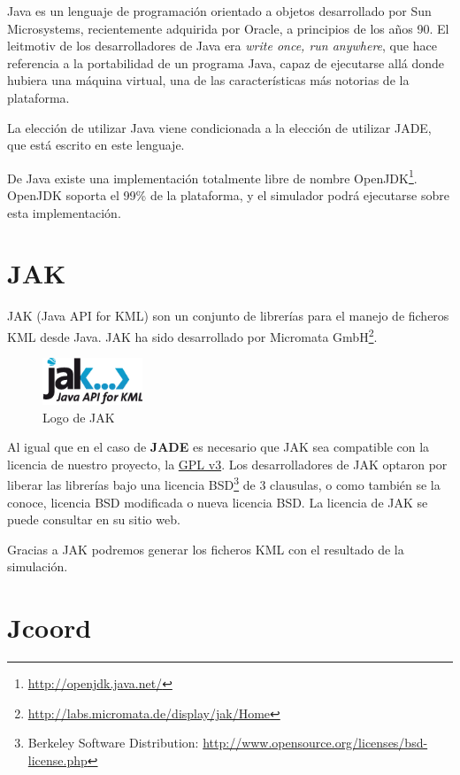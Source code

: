 Java es un lenguaje de programación orientado a objetos desarrollado por Sun
Microsystems, recientemente adquirida por Oracle, a principios de los años 90.
El leitmotiv de los desarrolladores de Java era {\em write once, run anywhere},
que hace referencia a la portabilidad de un programa Java, capaz de ejecutarse
allá donde hubiera una máquina virtual, una de las características más notorias
de la plataforma.

La elección de utilizar Java viene condicionada a la elección de utilizar JADE,
que está escrito en este lenguaje.

De Java existe una implementación totalmente libre de nombre
OpenJDK\footnote{\url{http://openjdk.java.net/}}. OpenJDK soporta el 99\% de la
plataforma, y el simulador podrá ejecutarse sobre esta implementación.

\section*{JAK}

JAK (Java API for KML) son un conjunto de librerías para el manejo de ficheros
KML desde Java. JAK ha sido desarrollado por Micromata
GmbH\footnote{\url{http://labs.micromata.de/display/jak/Home}}.

\begin{figure}[H]
 \centering
 \includegraphics[width=30mm]{figuras/cap4/jak.png}
 \caption{Logo de JAK}
\end{figure}

Al igual que en el caso de {\bf JADE} es necesario que JAK sea compatible con
la licencia de nuestro proyecto, la \hyperref[ap1]{GPL v3}.
Los desarrolladores de JAK optaron por liberar las librerías bajo una licencia
BSD\footnote{Berkeley Software Distribution:
\url{http://www.opensource.org/licenses/bsd-license.php}} de 3 clausulas, o como
también se la conoce, licencia BSD modificada o nueva licencia BSD. La licencia
de JAK se puede consultar en su sitio web.

Gracias a JAK podremos generar los ficheros KML con el resultado de la
simulación.

\section*{Jcoord}

